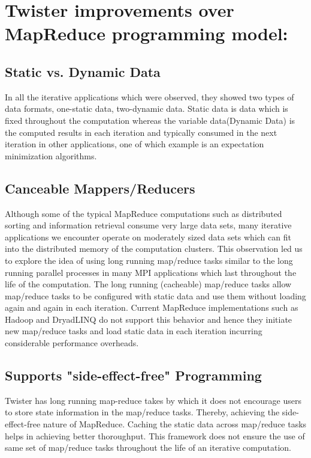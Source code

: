 \documentclass[9pt,twocolumn,twoside]{styles/osajnl}
\begin{document}
\section{Twister improvements over MapReduce programming model:}
\label{sec:examples}


\subsection{Static vs. Dynamic Data}
In all the iterative applications which were observed, they showed two
types of data formats, one-static data, two-dynamic data\cite{grolinger2014challenges}.  Static data
is data which is fixed throughout the computation whereas the variable
data(Dynamic Data) is the computed results in each iteration and
typically consumed in the next iteration in other applications, one of
which example is an expectation minimization algorithms\cite{doulkeridis2014survey}.

\subsection{Canceable Mappers/Reducers}
Although some of the typical MapReduce computations such as
distributed sorting and information retrieval consume very large data
sets, many iterative applications we encounter operate on moderately
sized data sets which can fit into the distributed memory of the
computation clusters\cite{elsayed2014mapreduce}. This observation led
us to explore the idea of using long running map/reduce tasks similar
to the long running parallel processes in many MPI applications which
last throughout the life of the computation. The long running
(cacheable) map/reduce tasks allow map/reduce tasks to be configured
with static data and use them without loading again and again in each
iteration\cite{lee2012parallel}. Current MapReduce implementations
such as Hadoop and DryadLINQ do not support this behavior and hence
they initiate new map/reduce tasks and load static data in each
iteration incurring considerable performance overheads\cite{twister}.

\subsection{Supports "side-effect-free" Programming}
Twister has long running map-reduce takes by which it does not
encourage users to store state information in the map/reduce
tasks. Thereby, achieving the side-effect-free nature of
MapReduce. Caching the static data across map/reduce tasks helps in
achieving better thoroughput\cite{lee2012parallel}. This framework
does not ensure the use of same set of map/reduce tasks throughout the
life of an iterative computation\cite{twister}.
\end{document}
